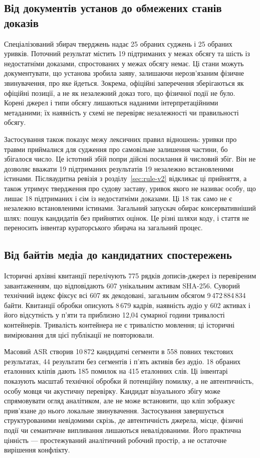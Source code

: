\subsection{Від документів установ до обмежених станів доказів}
Спеціалізований збирач тверджень надає 25 обраних суджень і 25 обраних уривків. Поточний результат містить 19 підтриманих у межах обсягу та шість із недостатніми доказами, спростованих у межах обсягу немає. Ці стани можуть документувати, що установа зробила заяву, залишаючи нерозв'язаним фізичне звинувачення, про яке йдеться. Зокрема, офіційні заперечення зберігаються як офіційні позиції, а не як незалежний доказ того, що фізичної події не було. Корені джерел і типи обсягу лишаються наданими інтерпретаційними метаданими; їх наявність у схемі не перевіряє незалежності чи правильності обсягу.

Застосування також показує межу лексичних правил відношень: уривки про травми приймалися для судження про самовільне залишення частини, бо збігалося число. Це істотний збій попри дійсні посилання й числовий збіг. Він не дозволяє вважати 19 підтриманих результатів 19 незалежно встановленими істинами. Післяаудитна ревізія з розділу~\ref{sec:rule-v2} відкликає ці прийняття, а також утримує твердження про судову заставу, уривок якого не називає особу, що лишає 18 підтриманих і сім із недостатніми доказами. Ці 18 так само не є незалежно встановленими істинами. Загальний запускач обирає консервативніший шлях: пошук кандидатів без прийнятих оцінок. Це різні шляхи коду, і стаття не переносить інвентар кураторського збирача на загальний процес.

\subsection{Від байтів медіа до кандидатних спостережень}
Історичні архівні квитанції перелічують 775 рядків дописів-джерел із перевіреним завантаженням, що відповідають 607 унікальним активам SHA-256. Суворий технічний індекс фіксує всі 607 як декодовані, загальним обсягом 9\,472\,884\,834 байти. Квитанції обробки описують 8\,679 кадрів, наявність аудіо у 602 активах і його відсутність у п'яти та приблизно 12,04 сумарної години тривалості контейнерів. Тривалість контейнера не є тривалістю мовлення; ці історичні вимірювання для цієї публікації не повторювали.

Масовий ASR створив 10\,872 кандидатні сегменти в 558 повних текстових результатах, 44 результати без сегментів і п'ять активів без аудіо. 18 обраних еталонних кліпів дають 185 помилок на 415 еталонних слів. Ці інвентарі показують масштаб технічної обробки й потенційну помилку, а не автентичність, особу мовця чи акустичну перевірку. Кандидат візуального збігу може спрямовувати огляд аналітиком, але не може встановити, що кліп зображує прив'язане до нього локальне звинувачення. Застосування завершується структурованими невідомими скрізь, де автентичність джерела, місце, фізичні події чи семантичне випливання лишаються невалідованими. Його практична цінність --- простежуваний аналітичний робочий простір, а не остаточне вирішення конфлікту.
